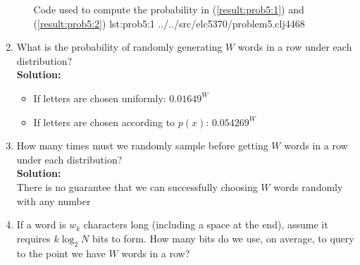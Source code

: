 \documentclass{assignment}
\begin{document}
\begin{enumerate}
\begin{itemize}
      {Code used to compute the probability in (\ref{result:prob5:1}) and (\ref{result:prob5:2})}
      {lst:prob5:1}
      {../../src/elc5370/problem5.clj}{44}{68}

  \end{itemize}


\item What is the probability of randomly generating $W$ words in a row under each distribution?\\
  \textbf{Solution:}\\
  \begin{itemize}
  \item If letters are chosen uniformly: $0.01649^W$
  \item If letters are chosen according to $p(x)$: $0.054269^W$
  \end{itemize}
\item How many times must we randomly sample before getting $W$ words in a row under each distribution?\\
  \textbf{Solution:}\\
  There is no guarantee that we can successfully choosing $W$ words randomly with any number 
  
\item If a word is $w_k$ characters long (including a space at the end), assume it requires $k \log_2 N$ bits to form. How many bits do we use, on average, to query to the point we have $W$ words in a row?
\end{enumerate}
\end{document}
